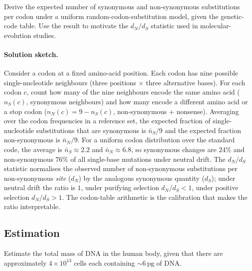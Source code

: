 \begin{exercise}
Derive the expected number of synonymous and non-synonymous
substitutions per codon under a uniform random-codon-substitution
model, given the genetic-code table. Use the result to motivate the
$d_N/d_S$ statistic used in molecular-evolution studies.
\end{exercise}

\paragraph{Solution sketch.} Consider a codon at a fixed amino-acid
position. Each codon has nine possible single-nucleotide neighbours
(three positions $\times$ three alternative bases). For each codon
$c$, count how many of the nine neighbours encode the same amino acid
($n_S(c)$, synonymous neighbours) and how many encode a different
amino acid or a stop codon ($n_N(c) = 9 - n_S(c)$, non-synonymous +
nonsense). Averaging over the codon frequencies in a reference set,
the expected fraction of single-nucleotide substitutions that are
synonymous is $\bar{n}_S / 9$ and the expected fraction non-synonymous
is $\bar{n}_N / 9$. For a uniform codon distribution over the standard
code, the average is $\bar{n}_S \approx 2.2$ and $\bar{n}_N \approx
6.8$, so synonymous changes are $24\%$ and non-synonymous $76\%$ of
all single-base mutations under neutral drift. The $d_N/d_S$ statistic
normalises the observed number of non-synonymous substitutions per
non-synonymous \emph{site} ($d_N$) by the analogous synonymous quantity
($d_S$); under neutral drift the ratio is $1$, under purifying
selection $d_N/d_S < 1$, under positive selection $d_N/d_S > 1$. The
codon-table arithmetic is the calibration that makes the ratio
interpretable.

\subsection*{Estimation}

\begin{exercise}
Estimate the total mass of DNA in the human body, given that there
are approximately $4 \times 10^{13}$ cells each containing
$\sim 6\,\text{pg}$ of DNA.
\end{exercise}

